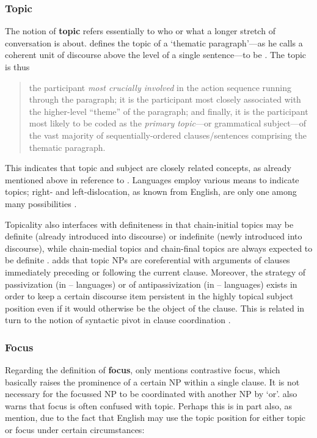 \subsubsection{Topic}

The notion of \textbf{topic} refers essentially to who or what a longer stretch
of conversation is about. \citet{givon1983} defines the topic of a `thematic
paragraph'---as he calls a coherent unit of discourse above the level of a
single sentence---to be . The topic is thus

\blockcquote[8]{givon1983}{the participant \emph{most crucially involved} in
the action sequence running through the paragraph; it is the participant most
closely associated with the higher-level \enquote{theme} of the paragraph; and
finally, it is the participant most likely to be coded as the \emph{primary
topic}---or grammatical subject---of the vast majority of sequentially-ordered
clauses/sentences comprising the thematic paragraph.}

This indicates that topic and subject are closely related concepts, as already
mentioned above in reference to \citet{comrie1989}. Languages employ various
means to indicate topics; right- and left-dislocation, as known from English,
are only one among many possibilities \citep[174]{dixon2010}.

Topicality also interfaces with definiteness in that chain-initial topics may
be definite (already introduced into discourse) or indefinite (newly introduced
into discourse), while chain-medial topics and chain-final topics are always
expected to be definite \citep[10]{givon1983}. \citet[171]{dixon2010} adds that
topic NPs are coreferential with arguments of clauses immediately preceding or
following the current clause. Moreover, the strategy of passivization (in
\Nom{}--\Acc{} languages) or of antipassivization (in \Abs{}--\Erg{} languages)
exists in order to keep a certain discourse item persistent in the highly
topical subject position even if it would otherwise be the object of the
clause. This is related in turn to the notion of syntactic pivot in clause
coordination \citep[172]{dixon2010}.

\subsubsection{Focus}

Regarding the definition of \textbf{focus}, \citet[174]{dixon2010} only
mentions contrastive focus, which basically raises the prominence of a certain
NP within a single clause. It is not necessary for the focussed NP to be
coordinated with another NP by `or'. \citet{dixon2010} also warns that focus
is often confused with topic. Perhaps this is in part also, as
\citet{bresnan2016} mention, due to the fact that English may use the topic
position for either topic or focus under certain circumstances:

